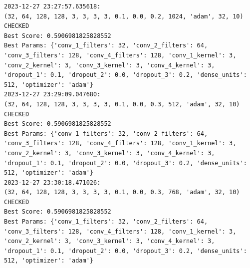 \begin{verbatim}
2023-12-27 23:27:57.635618: 
(32, 64, 128, 128, 3, 3, 3, 3, 0.1, 0.0, 0.2, 1024, 'adam', 32, 10) CHECKED
Best Score: 0.5906981825828552
Best Params: {'conv_1_filters': 32, 'conv_2_filters': 64, 'conv_3_filters': 128, 'conv_4_filters': 128, 'conv_1_kernel': 3, 'conv_2_kernel': 3, 'conv_3_kernel': 3, 'conv_4_kernel': 3, 'dropout_1': 0.1, 'dropout_2': 0.0, 'dropout_3': 0.2, 'dense_units': 512, 'optimizer': 'adam'}
2023-12-27 23:29:09.047680:
(32, 64, 128, 128, 3, 3, 3, 3, 0.1, 0.0, 0.3, 512, 'adam', 32, 10) CHECKED
Best Score: 0.5906981825828552
Best Params: {'conv_1_filters': 32, 'conv_2_filters': 64, 'conv_3_filters': 128, 'conv_4_filters': 128, 'conv_1_kernel': 3, 'conv_2_kernel': 3, 'conv_3_kernel': 3, 'conv_4_kernel': 3, 'dropout_1': 0.1, 'dropout_2': 0.0, 'dropout_3': 0.2, 'dense_units': 512, 'optimizer': 'adam'}
2023-12-27 23:30:18.471026:
(32, 64, 128, 128, 3, 3, 3, 3, 0.1, 0.0, 0.3, 768, 'adam', 32, 10) CHECKED
Best Score: 0.5906981825828552
Best Params: {'conv_1_filters': 32, 'conv_2_filters': 64, 'conv_3_filters': 128, 'conv_4_filters': 128, 'conv_1_kernel': 3, 'conv_2_kernel': 3, 'conv_3_kernel': 3, 'conv_4_kernel': 3, 'dropout_1': 0.1, 'dropout_2': 0.0, 'dropout_3': 0.2, 'dense_units': 512, 'optimizer': 'adam'}
\end{verbatim}

\newpage

